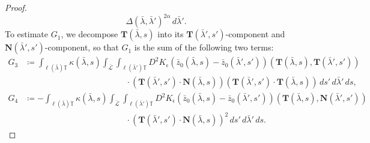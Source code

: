\documentclass[reqno,centertags,12pt]{amsart}
\theoremstyle{definition}
\numberwithin{equation}{section}
\newcommand{\bbT}{{\mathbb{T}}}
\begin{document}
\begin{proof}
\[        {\Delta(\bar{\lambda},\bar{\lambda}')^{2\alpha}}
        \,d\bar{\lambda}'.
    \]
    To estimate $G_{1}$, we decompose $\mathbf{T}(\bar{\lambda},s)$ into its
    $\mathbf{T}(\bar{\lambda}',s')$-component and
    $\mathbf{N}(\bar{\lambda}',s')$-component, so that $G_{1}$ is the sum of the
    following two terms:
    \begin{align*}
        G_{3} &\coloneqq
        \int_{\ell(\bar{\lambda})\bbT}\kappa(\bar{\lambda},s)
        \int_{\bar{\mathcal{L}}}\int_{\ell(\bar{\lambda}')\bbT}
        D^{2}K_{\epsilon}(\bar{z}_{0}(\bar{\lambda},s) - \bar{z}_{0}(\bar{\lambda}',s'))
        (\mathbf{T}(\bar{\lambda},s),\mathbf{T}(\bar{\lambda}',s'))
        \\&\quad\quad\quad\quad\quad\quad\quad\quad\quad\quad\quad\quad
        \cdot(\mathbf{T}(\bar{\lambda}',s')\cdot\mathbf{N}(\bar{\lambda},s))
        (\mathbf{T}(\bar{\lambda}',s')\cdot\mathbf{T}(\bar{\lambda},s))
        \,ds'\,d\bar{\lambda}'\,ds, \\
        G_{4} &\coloneqq
        -\int_{\ell(\bar{\lambda})\bbT}\kappa(\bar{\lambda},s)
        \int_{\bar{\mathcal{L}}}\int_{\ell(\bar{\lambda}')\bbT}
        D^{2}K_{\epsilon}(\bar{z}_{0}(\bar{\lambda},s) - \bar{z}_{0}(\bar{\lambda}',s'))
        (\mathbf{T}(\bar{\lambda},s),\mathbf{N}(\bar{\lambda}',s'))
        \\&\quad\quad\quad\quad\quad\quad\quad\quad\quad\quad\quad\quad
        \cdot(\mathbf{T}(\bar{\lambda}',s')\cdot\mathbf{N}(\bar{\lambda},s))^{2}
        \,ds'\,d\bar{\lambda}'\,ds.
    \end{align*}


\end{proof}
\end{document}
